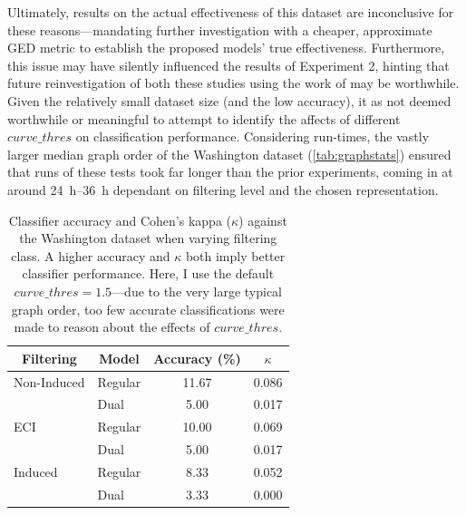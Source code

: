 \documentclass{mpaper}
\begin{document}
Ultimately, results on the actual effectiveness of this dataset are inconclusive for these reasons---mandating further investigation with a cheaper, approximate GED metric to establish the proposed models' true effectiveness.
Furthermore, this issue may have silently influenced the results of Experiment 2, hinting that future reinvestigation of both these studies using the work of \citeauthor{GED-Approx} \cite{GED-Approx} may be worthwhile.
Given the relatively small dataset size (and the low accuracy), it as not deemed worthwhile or meaningful to attempt to identify the affects of different $\mathit{curve\_thres}$ on classification performance.
Considering run-times, the vastly larger median graph order of the Washington dataset (\cref{tab:graphstats}) ensured that runs of these tests took far longer than the prior experiments, coming in at around \SIrange{24}{36}{\hour} dependant on filtering level and the chosen representation.

\begin{table}
	\centering

	\begin{tabular}{llcc}
		\toprule
		\multicolumn{1}{c}{Filtering} & \multicolumn{1}{c}{Model} & Accuracy (\si{\percent}) & $\kappa$ \\
		\midrule
		
		Non-Induced & Regular & 11.67 & 0.086 \\
		& Dual & 5.00 & 0.017 \\
		
		ECI & Regular & 10.00 & 0.069 \\
		& Dual & 5.00 & 0.017 \\
		
		Induced & Regular & 8.33 & 0.052 \\
		& Dual & 3.33 & 0.000 \\
		
		\bottomrule
	\end{tabular}
	
	\vspace{0.5em}
	\caption{
		Classifier accuracy and Cohen's kappa ($\kappa$) against the Washington dataset when varying filtering class.
		A higher accuracy and $\kappa$ both imply better classifier performance.
		Here, I use the default $\mathit{curve\_thres}=1.5$---due to the very large typical graph order, too few accurate classifications were made to reason about the effects of $\mathit{curve\_thres}$.
		\label{tab:exp3}
	}
\end{table}
\end{document}
